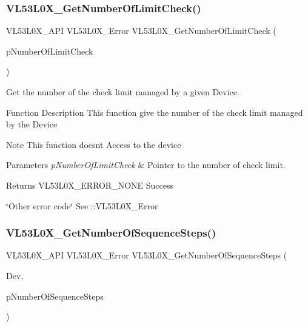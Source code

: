 \subsubsection{\texorpdfstring{V\+L53\+L0\+X\+\_\+\+Get\+Number\+Of\+Limit\+Check()}{VL53L0X\_GetNumberOfLimitCheck()}}
{\footnotesize\ttfamily V\+L53\+L0\+X\+\_\+\+A\+PI V\+L53\+L0\+X\+\_\+\+Error V\+L53\+L0\+X\+\_\+\+Get\+Number\+Of\+Limit\+Check (\begin{DoxyParamCaption}\item[{\hyperlink{vl53l0x__types_8h_a273cf69d639a59973b6019625df33e30}{uint16\+\_\+t} $\ast$}]{p\+Number\+Of\+Limit\+Check }\end{DoxyParamCaption})}



Get the number of the check limit managed by a given Device. 

\begin{DoxyParagraph}{Function Description}
This function give the number of the check limit managed by the Device
\end{DoxyParagraph}
\begin{DoxyNote}{Note}
This function doesn\textquotesingle{}t Access to the device
\end{DoxyNote}

\begin{DoxyParams}{Parameters}
{\em p\+Number\+Of\+Limit\+Check} & Pointer to the number of check limit. \\
\hline
\end{DoxyParams}
\begin{DoxyReturn}{Returns}
V\+L53\+L0\+X\+\_\+\+E\+R\+R\+O\+R\+\_\+\+N\+O\+NE Success 

\char`\"{}\+Other error code\char`\"{} See \+::\+V\+L53\+L0\+X\+\_\+\+Error 
\end{DoxyReturn}
\mbox{\label{group__VL53L0X__parameters__group_ga04e798f39db282735d534e36bae9b4e8}} 
\subsubsection{\texorpdfstring{V\+L53\+L0\+X\+\_\+\+Get\+Number\+Of\+Sequence\+Steps()}{VL53L0X\_GetNumberOfSequenceSteps()}}
{\footnotesize\ttfamily V\+L53\+L0\+X\+\_\+\+A\+PI V\+L53\+L0\+X\+\_\+\+Error V\+L53\+L0\+X\+\_\+\+Get\+Number\+Of\+Sequence\+Steps (\begin{DoxyParamCaption}\item[{\hyperlink{group__VL53L0X__platform__group_ga2d6405308b1dd524b462f1b8fb97d167}{V\+L53\+L0\+X\+\_\+\+D\+EV}}]{Dev,  }\item[{\hyperlink{vl53l0x__types_8h_aba7bc1797add20fe3efdf37ced1182c5}{uint8\+\_\+t} $\ast$}]{p\+Number\+Of\+Sequence\+Steps }\end{DoxyParamCaption})}




